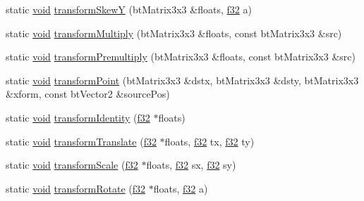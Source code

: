 \begin{DoxyCompactItemize}
static \mbox{\hyperlink{_thread_8h_af1e856da2e658414cb2456cb6f7ebc66}{void}} \mbox{\hyperlink{classnjli_1_1_world_h_u_d_a3d6e9ec19d114e055f265f1dfcf52a52}{transform\+SkewY}} (bt\+Matrix3x3 \&floats, \mbox{\hyperlink{_util_8h_a5f6906312a689f27d70e9d086649d3fd}{f32}} a)
\item 
static \mbox{\hyperlink{_thread_8h_af1e856da2e658414cb2456cb6f7ebc66}{void}} \mbox{\hyperlink{classnjli_1_1_world_h_u_d_a5420b08725cf40282afa2d1b68d02c3d}{transform\+Multiply}} (bt\+Matrix3x3 \&floats, const bt\+Matrix3x3 \&src)
\item 
static \mbox{\hyperlink{_thread_8h_af1e856da2e658414cb2456cb6f7ebc66}{void}} \mbox{\hyperlink{classnjli_1_1_world_h_u_d_a40e8fc1b423372f8998589a47ad339e7}{transform\+Premultiply}} (bt\+Matrix3x3 \&floats, const bt\+Matrix3x3 \&src)
\item 
static \mbox{\hyperlink{_thread_8h_af1e856da2e658414cb2456cb6f7ebc66}{void}} \mbox{\hyperlink{classnjli_1_1_world_h_u_d_ad78b88b75910673697709669c9683524}{transform\+Point}} (bt\+Matrix3x3 \&dstx, bt\+Matrix3x3 \&dsty, bt\+Matrix3x3 \&xform, const bt\+Vector2 \&source\+Pos)
\item 
static \mbox{\hyperlink{_thread_8h_af1e856da2e658414cb2456cb6f7ebc66}{void}} \mbox{\hyperlink{classnjli_1_1_world_h_u_d_a955b40e9d22eec4542d89d1f4d9b054b}{transform\+Identity}} (\mbox{\hyperlink{_util_8h_a5f6906312a689f27d70e9d086649d3fd}{f32}} $\ast$floats)
\item 
static \mbox{\hyperlink{_thread_8h_af1e856da2e658414cb2456cb6f7ebc66}{void}} \mbox{\hyperlink{classnjli_1_1_world_h_u_d_a64d5d8707fd3ed3f9df794e55a3fb4af}{transform\+Translate}} (\mbox{\hyperlink{_util_8h_a5f6906312a689f27d70e9d086649d3fd}{f32}} $\ast$floats, \mbox{\hyperlink{_util_8h_a5f6906312a689f27d70e9d086649d3fd}{f32}} tx, \mbox{\hyperlink{_util_8h_a5f6906312a689f27d70e9d086649d3fd}{f32}} ty)
\item 
static \mbox{\hyperlink{_thread_8h_af1e856da2e658414cb2456cb6f7ebc66}{void}} \mbox{\hyperlink{classnjli_1_1_world_h_u_d_adbae8989f55badf21f7e57436737d001}{transform\+Scale}} (\mbox{\hyperlink{_util_8h_a5f6906312a689f27d70e9d086649d3fd}{f32}} $\ast$floats, \mbox{\hyperlink{_util_8h_a5f6906312a689f27d70e9d086649d3fd}{f32}} sx, \mbox{\hyperlink{_util_8h_a5f6906312a689f27d70e9d086649d3fd}{f32}} sy)
\item 
static \mbox{\hyperlink{_thread_8h_af1e856da2e658414cb2456cb6f7ebc66}{void}} \mbox{\hyperlink{classnjli_1_1_world_h_u_d_ab3b5c6780f1136e327b308197aba9908}{transform\+Rotate}} (\mbox{\hyperlink{_util_8h_a5f6906312a689f27d70e9d086649d3fd}{f32}} $\ast$floats, \mbox{\hyperlink{_util_8h_a5f6906312a689f27d70e9d086649d3fd}{f32}} a)

\end{DoxyCompactItemize}
